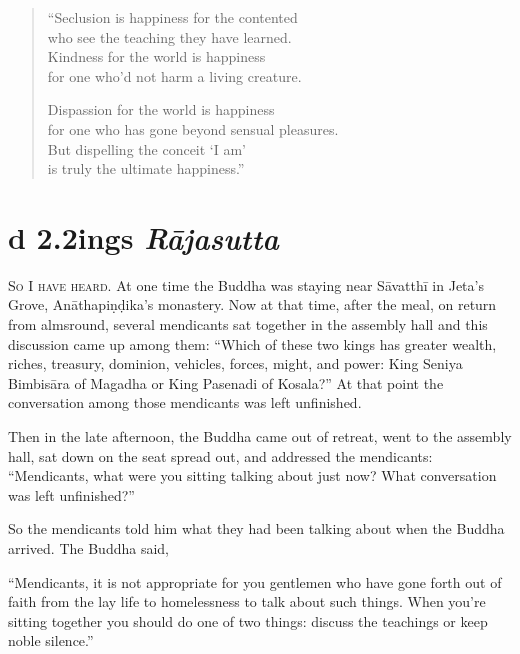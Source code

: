 \documentclass[12pt,openany]{book}%
\newcommand*{\suttatitleacronym}[1]{\smaller[2]{#1}\vspace*{.3em}}
\newcommand*{\suttatitletranslation}[1]{\linebreak{#1}}
\newcommand*{\suttatitleroot}[1]{\linebreak\smaller[2]\itshape{#1}}
\newcommand*{\tocacronym}[1]{\hspace*{-3.3em}{#1}\quad}
\newcommand*{\toctranslation}[1]{#1}
\newcommand*{\tocroot}[1]{(\textit{#1})}
\newcommand*{\scevam}[1]{\textsc{#1}}
\begin{document}
\begin{verse}%
“Seclusion is happiness for the contented \\
who see the teaching they have learned. \\
Kindness for the world is happiness \\
for one who’d not harm a living creature. 

Dispassion for the world is happiness \\
for one who has gone beyond sensual pleasures. \\
But dispelling the conceit ‘I am’ \\
is truly the ultimate happiness.” 

%
\end{verse}

%
\section*{{\suttatitleacronym Ud 2.2}{\suttatitletranslation Kings }{\suttatitleroot Rājasutta}}
\addcontentsline{toc}{section}{\tocacronym{Ud 2.2} \toctranslation{Kings } \tocroot{Rājasutta}}

\scevam{So I have heard. }At one time the Buddha was staying near \textsanskrit{Sāvatthī} in Jeta’s Grove, \textsanskrit{Anāthapiṇḍika}’s monastery. Now at that time, after the meal, on return from almsround, several mendicants sat together in the assembly hall and this discussion came up among them: “Which of these two kings has greater wealth, riches, treasury, dominion, vehicles, forces, might, and power: King Seniya \textsanskrit{Bimbisāra} of Magadha or King Pasenadi of Kosala?” At that point the conversation among those mendicants was left unfinished. 

Then in the late afternoon, the Buddha came out of retreat, went to the assembly hall, sat down on the seat spread out, and addressed the mendicants: “Mendicants, what were you sitting talking about just now? What conversation was left unfinished?” 

So the mendicants told him what they had been talking about when the Buddha arrived. The Buddha said, 

“Mendicants, it is not appropriate for you gentlemen who have gone forth out of faith from the lay life to homelessness to talk about such things. When you’re sitting together you should do one of two things: discuss the teachings or keep noble silence.” 
\end{document}

